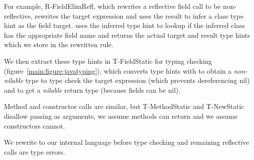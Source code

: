 For example, R-FieldElimRefl, which rewrites a reflective field call to be non-reflective,
rewrites the target expression and uses the result to infer a class type hint as the field target.
\fieldtypeliteral{} uses the inferred type hint to lookup if the inferred class has the appropriate
field name and returns the actual target and result type hints which we store in the rewritten rule.

We then extract these type hints in T-FieldStatic for typing checking 
(figure~\ref{main:figure:javatyping}), which converts type hints
with \javatotcliteral{} to obtain a \emph{non-nilable} type to type check the target expression (which prevents
dereferencing nil) and \javatotcnilliteral{} to get a \emph{nilable} return type (because fields can be nil).

Method and constructor calls are similar, but T-MethodStatic and T-NewStatic disallow passing \nil{} as arguments, 
we assume methods can return \nil{} and we assume constructors cannot.

We rewrite to our internal language before type checking and remaining reflective calls are type errors.

{\footnotesize


}

{}
